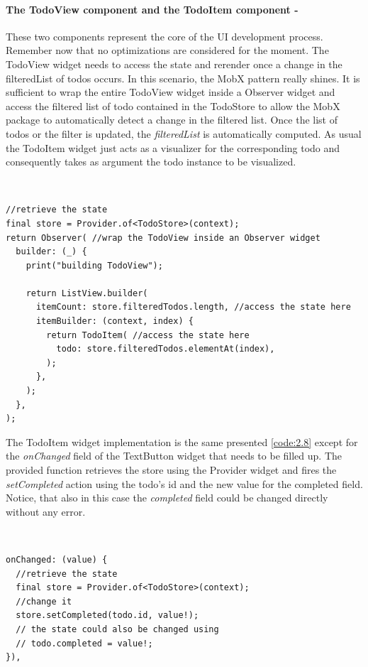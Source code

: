 \paragraph{The TodoView component and the TodoItem component - }
\label{subpar:todo_app_bloc_core_state} These two components represent the core of the UI development process. Remember now that no optimizations are considered for the moment. The TodoView widget needs to access the state and rerender once a change in the filteredList of todos occurs. In this scenario, the MobX pattern really shines. It is sufficient to wrap the entire TodoView widget inside a Observer widget and access the filtered list of todo contained in the TodoStore to allow the MobX package to automatically detect a change in the filtered list. Once the list of todos or the filter is updated, the \textit{filteredList} is automatically computed. As usual the TodoItem widget just acts as a visualizer for the corresponding todo and consequently takes as argument the todo instance to be visualized.
\begin{code}
\mbox{}\\
 \mbox{}
		\label{code:2.14}
\begin{verbatim}
//retrieve the state
final store = Provider.of<TodoStore>(context);
return Observer( //wrap the TodoView inside an Observer widget
  builder: (_) {
    print("building TodoView");

    return ListView.builder(
      itemCount: store.filteredTodos.length, //access the state here
      itemBuilder: (context, index) {
        return TodoItem( //access the state here
          todo: store.filteredTodos.elementAt(index),
        );
      },
    );
  },
);
\end{verbatim}
\mbox{}
\end{code}

The TodoItem widget implementation is the same presented \ref{code:2.8} except for the \textit{onChanged} field of the TextButton widget that needs to be filled up. The provided function retrieves the store using the Provider widget and fires the \textit{setCompleted }action using the todo’s id and the new value for the completed field. Notice, that also in this case the \textit{completed} field could be changed directly without any error.
\begin{code}
\mbox{}\\
 \mbox{}
		\label{code:2.14}
\begin{verbatim}
onChanged: (value) {
  //retrieve the state
  final store = Provider.of<TodoStore>(context);
  //change it
  store.setCompleted(todo.id, value!);
  // the state could also be changed using
  // todo.completed = value!;
}),
\end{verbatim}
\mbox{}
\end{code}


